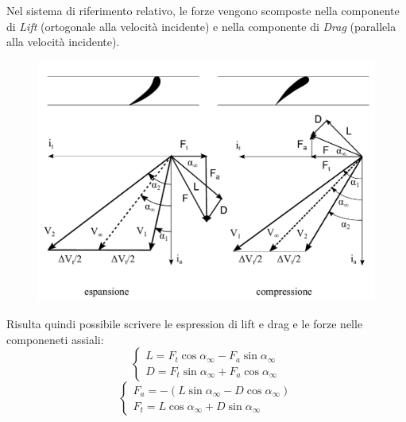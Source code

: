 Nel sistema di riferimento relativo, le forze vengono scomposte nella componente di \textit{Lift} (ortogonale alla velocità incidente) e nella componente di \textit{Drag} (parallela alla velocità incidente). 
\begin{figure}
\centering
  \includegraphics[width=.7\textwidth]{fig/triang1.pdf}
\caption{}
\label{fig:triang1}
\end{figure}
Risulta quindi possibile scrivere le espression di lift e drag e le forze nelle componeneti assiali:
\begin{equation}
	\begin{cases} 
		L = F_t \cos \alpha_{\infty} -  F_a \sin \alpha_{\infty}\\
		D = F_t \sin \alpha_{\infty} +  F_a \cos \alpha_{\infty}
	\end{cases}
\end{equation}
\begin{equation}
	\begin{cases} 
		F_a = - (L\sin \alpha_{\infty} -  D \cos \alpha_{\infty})\\
		F_t = L \cos \alpha_{\infty} +  D \sin \alpha_{\infty}
	\end{cases}
\end{equation}

